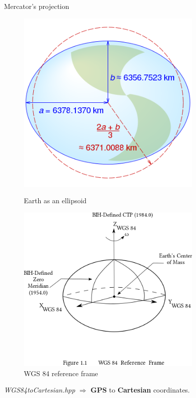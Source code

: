 \documentclass[12pt]{beamer}
\begin{document}
\begin{frame}{Mercator's projection}
  \begin{figure}[H]
    \centering
    \begin{minipage}{0.49\textwidth}
        \centering
        \includegraphics[width=0.8\textwidth]{images/WGS84_mean_Earth_radius.svg.png}
        \caption{Earth as an ellipsoid}
    \end{minipage}\hfill
    \begin{minipage}{0.49\textwidth}
        \centering
        \includegraphics[width=0.8\textwidth]{images/WGS_84_reference_frame.png}
        \caption{WGS 84 reference frame}
    \end{minipage}
\end{figure}

\textit{WGS84toCartesian.hpp} $\Longrightarrow$ \textbf{GPS} to \textbf{Cartesian} coordinates.
\end{frame}
\end{document}
